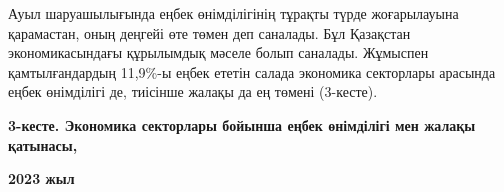 {{Ауыл шаруашылығында еңбек өнімділігінің тұрақты түрде жоғарылауына
қарамастан, оның деңгейі өте төмен деп саналады. Бұл Қазақстан
экономикасындағы құрылымдық мәселе болып саналады. Жұмыспен
қамтылғандардың 11,9\%-ы еңбек ететін салада экономика секторлары
арасында еңбек өнімділігі де, тиісінше жалақы да ең төмені (3-кесте).

{\bfseries 3-кесте. Экономика секторлары бойынша еңбек өнімділігі мен
жалақы қатынасы,}

{\bfseries 2023 жыл}

% 
% 
% 
% 
% 
}}
